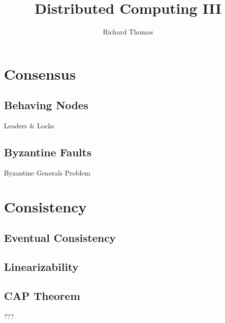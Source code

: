 \pagebreak

\title{Distributed Computing III}
\date{}
\author{Richard Thomas}

\maketitle

\section{Consensus}

\subsection{Behaving Nodes}
Leaders \& Locks

\subsection{Byzantine Faults}
Byzantine Generals Problem

\section{Consistency}

\subsection{Eventual Consistency}

\subsection{Linearizability}

\subsection{CAP Theorem}

???




